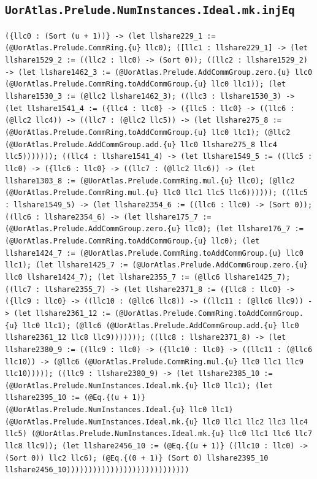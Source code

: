 \documentclass[11pt]{article}
\begin{document}
\subsection*{\texttt{UorAtlas.Prelude.NumInstances.Ideal.mk.injEq}}
\noindent\texttt{(\{llc0 : (Sort (u + 1))\} -> (let llshare229\_1 := (@UorAtlas.Prelude.CommRing.\{u\} llc0); ([llc1 : llshare229\_1] -> (let llshare1529\_2 := ((llc2 : llc0) -> (Sort 0)); ((llc2 : llshare1529\_2) -> (let llshare1462\_3 := (@UorAtlas.Prelude.AddCommGroup.zero.\{u\} llc0 (@UorAtlas.Prelude.CommRing.toAddCommGroup.\{u\} llc0 llc1)); (let llshare1530\_3 := (@llc2 llshare1462\_3); ((llc3 : llshare1530\_3) -> (let llshare1541\_4 := (\{llc4 : llc0\} -> (\{llc5 : llc0\} -> ((llc6 : (@llc2 llc4)) -> ((llc7 : (@llc2 llc5)) -> (let llshare275\_8 := (@UorAtlas.Prelude.CommRing.toAddCommGroup.\{u\} llc0 llc1); (@llc2 (@UorAtlas.Prelude.AddCommGroup.add.\{u\} llc0 llshare275\_8 llc4 llc5))))))); ((llc4 : llshare1541\_4) -> (let llshare1549\_5 := ((llc5 : llc0) -> (\{llc6 : llc0\} -> ((llc7 : (@llc2 llc6)) -> (let llshare1303\_8 := (@UorAtlas.Prelude.CommRing.mul.\{u\} llc0); (@llc2 (@UorAtlas.Prelude.CommRing.mul.\{u\} llc0 llc1 llc5 llc6)))))); ((llc5 : llshare1549\_5) -> (let llshare2354\_6 := ((llc6 : llc0) -> (Sort 0)); ((llc6 : llshare2354\_6) -> (let llshare175\_7 := (@UorAtlas.Prelude.AddCommGroup.zero.\{u\} llc0); (let llshare176\_7 := (@UorAtlas.Prelude.CommRing.toAddCommGroup.\{u\} llc0); (let llshare1424\_7 := (@UorAtlas.Prelude.CommRing.toAddCommGroup.\{u\} llc0 llc1); (let llshare1425\_7 := (@UorAtlas.Prelude.AddCommGroup.zero.\{u\} llc0 llshare1424\_7); (let llshare2355\_7 := (@llc6 llshare1425\_7); ((llc7 : llshare2355\_7) -> (let llshare2371\_8 := (\{llc8 : llc0\} -> (\{llc9 : llc0\} -> ((llc10 : (@llc6 llc8)) -> ((llc11 : (@llc6 llc9)) -> (let llshare2361\_12 := (@UorAtlas.Prelude.CommRing.toAddCommGroup.\{u\} llc0 llc1); (@llc6 (@UorAtlas.Prelude.AddCommGroup.add.\{u\} llc0 llshare2361\_12 llc8 llc9))))))); ((llc8 : llshare2371\_8) -> (let llshare2380\_9 := ((llc9 : llc0) -> (\{llc10 : llc0\} -> ((llc11 : (@llc6 llc10)) -> (@llc6 (@UorAtlas.Prelude.CommRing.mul.\{u\} llc0 llc1 llc9 llc10))))); ((llc9 : llshare2380\_9) -> (let llshare2385\_10 := (@UorAtlas.Prelude.NumInstances.Ideal.mk.\{u\} llc0 llc1); (let llshare2395\_10 := (@Eq.\{(u + 1)\} (@UorAtlas.Prelude.NumInstances.Ideal.\{u\} llc0 llc1) (@UorAtlas.Prelude.NumInstances.Ideal.mk.\{u\} llc0 llc1 llc2 llc3 llc4 llc5) (@UorAtlas.Prelude.NumInstances.Ideal.mk.\{u\} llc0 llc1 llc6 llc7 llc8 llc9)); (let llshare2456\_10 := (@Eq.\{(u + 1)\} ((llc10 : llc0) -> (Sort 0)) llc2 llc6); (@Eq.\{(0 + 1)\} (Sort 0) llshare2395\_10 llshare2456\_10))))))))))))))))))))))))))))}\par
\end{document}

